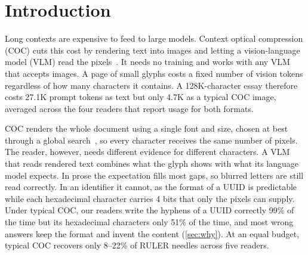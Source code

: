 \section{Introduction}
\label{sec:intro}

Long contexts are expensive to feed to large models.
Context optical compression (COC) cuts this cost by rendering text into images and letting a vision-language model (VLM) read the pixels~\cite{wei2025deepseekocr,cheng2025glyph,rust2023pixel}.
It needs no training and works with any VLM that accepts images.
A page of small glyphs costs a fixed number of vision tokens regardless of how many characters it contains. %
A 128K-character essay therefore costs 27.1K prompt tokens as text but only 4.7K as a typical COC image, averaged across the four readers that report usage for both formats.

COC renders the whole document using a single font and size, chosen at best through a global search~\cite{cheng2025glyph}, %
so every character receives the same number of pixels.
The reader, however, needs different evidence for different characters.
A VLM that reads rendered text combines what the glyph shows with what its language model expects.
In prose the expectation fills most gaps, so blurred letters are still read correctly.
In an identifier it cannot, as the format of a UUID is predictable while each hexadecimal character carries 4 bits that only the pixels can supply.
Under typical COC, our readers write the hyphens of a UUID correctly 99\% of the time but its hexadecimal characters only 51\% of the time, and most wrong answers keep the format and invent the content (\cref{sec:why}).
At an equal budget, typical COC recovers only 8--22\% of RULER needles across five readers.

